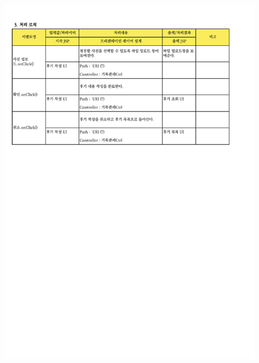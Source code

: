 {{{{{{{{{{{{{{{{{{{{{{{{{{{\includegraphics[width=20cm]{./Figure/Analysis/Display/review/review_02.pdf} \\
}}}}}}}}}}}}}}}}}}}}}}}}}}}
